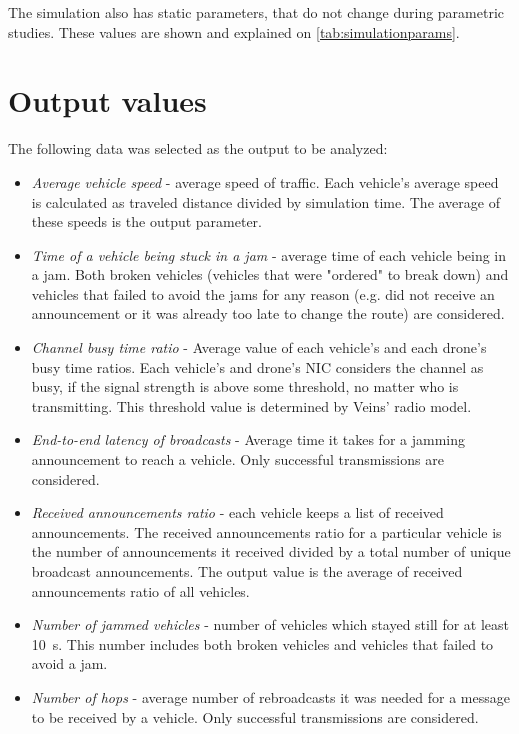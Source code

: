 \documentclass[]{nsm-thesis}
\begin{document}
The simulation also has static parameters, that do not change during parametric studies. These values are shown and explained on \cref{tab:simulationparams}.

\section{Output values}

The following data was selected as the output to be analyzed:

\begin{itemize}

	\item \emph{Average vehicle speed} - average speed of traffic. Each vehicle's average speed is calculated as traveled distance divided by simulation time. The average of these speeds is the output parameter.
	
	\item \emph{Time of a vehicle being stuck in a jam} - average time of each vehicle being in a jam. Both broken vehicles (vehicles that were "ordered" to break down) and vehicles that failed to avoid the jams for any reason (e.g. did not receive an announcement or it was already too late to change the route) are considered.
	
	\item \emph{Channel busy time ratio} - Average value of each vehicle's and each drone's busy time ratios. Each vehicle's and drone's \ac{NIC} considers the channel as busy, if the signal strength is above some threshold, no matter who is transmitting. This threshold value is determined by Veins' radio model.

	\item \emph{End-to-end latency of broadcasts} - Average time it takes for a jamming announcement to reach a vehicle. Only successful transmissions are considered.

	\item \emph{Received announcements ratio} - each vehicle keeps a list of received announcements. The received announcements ratio for a particular vehicle is the number of announcements it received divided by a total number of unique broadcast announcements. The output value is the average of received announcements ratio of all vehicles.

	\item \emph{Number of jammed vehicles} - number of vehicles which stayed still for at least \SI{10}{\second}. This number includes both broken vehicles and vehicles that failed to avoid a jam.

	\item \emph{Number of hops} - average number of rebroadcasts it was needed for a message to be received by a vehicle. Only successful transmissions are considered.

\end{itemize}
\end{document}

